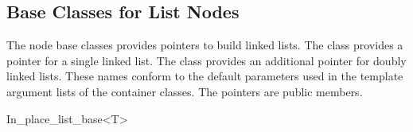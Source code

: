 \subsection{Base Classes for List Nodes}

\ccDefinition

The node base classes provides pointers to build linked
lists. The class  provides a pointer
 for a single linked list. The class
 provides an additional pointer
 for doubly linked lists. These names conform to
the default parameters used in the template argument lists of the
container classes. The pointers are public members.


\begin{ccClassTemplate}{In_place_list_base<T>}
\ccGlue
{}
\end{ccClassTemplate}

